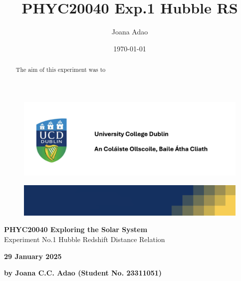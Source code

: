 \documentclass[12pt]{article}
\title{PHYC20040 Exp.1 Hubble RS}
\author{Joana Adao}
\date{\today}
\begin{document}
\begin{titlepage}
    \begin{center}

        \begin{figure}[ht]
            \includegraphics[width=\textwidth]{UCDLogo.png}
        \end{figure}
        
        \begin{figure}
            \centerline{\includegraphics[width=\paperwidth]{UCDBanner.png}}
        \end{figure}

        \vspace{4cm}

        {\LARGE \bfseries PHYC20040 Exploring the Solar System}\\
        \vspace{0.75cm}
        {\Large Experiment No.1 Hubble Redshift Distance Relation}
        
        \vspace{1cm}
    
    {\Large \textbf{29 January 2025 }}

    \vspace{2cm}
    
    {\large \textbf{by Joana C.C. Adao (Student No. 23311051)}}\\

    \end{center}
    
   \clearpage

\end{titlepage}

\setcounter{page}{1}
\tableofcontents

\newpage

\begin{abstract}

The aim of this experiment was to



\end{abstract}
\end{document}
